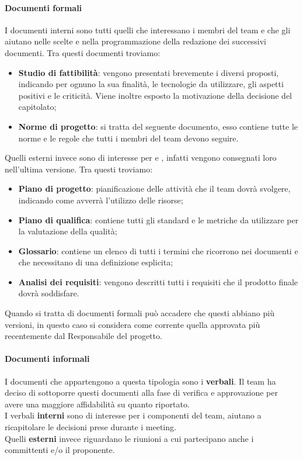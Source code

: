 \paragraph{Documenti formali}
I documenti interni sono tutti quelli che interessano i membri del team e che gli aiutano nelle scelte e nella programmazione della redazione dei successivi documenti.
Tra questi documenti troviamo:
\begin{itemize}
    \item\textbf{Studio di fattibilità}: vengono presentati brevemente i diversi  proposti, indicando per ognuno la sua finalità, le tecnologie da utilizzare, gli aspetti positivi e le criticità. Viene inoltre esposto la motivazione della decisione del capitolato;
    \item\textbf{Norme di progetto}: si tratta del seguente documento, esso contiene tutte le norme e le regole che tutti i membri del team devono seguire.
\end{itemize}
Quelli esterni invece sono di interesse per  e , infatti vengono consegnati loro nell'ultima versione.
Tra questi troviamo:
\begin{itemize}
    \item\textbf{Piano di progetto}: pianificazione delle attività che il team dovrà svolgere, indicando come avverrà l'utilizzo delle risorse;
    \item\textbf{Piano di qualifica}: contiene tutti gli standard e le metriche da utilizzare per la valutazione della qualità;
    \item\textbf{Glossario}: contiene un elenco di tutti i termini che ricorrono nei documenti e che necessitano di una definizione esplicita;
    \item\textbf{Analisi dei requisiti}: vengono descritti tutti i requisiti che il prodotto finale dovrà soddisfare.
\end{itemize}
Quando si tratta di documenti formali può accadere che questi abbiano più versioni, in questo caso si considera come corrente quella approvata più recentemente dal Responsabile del progetto.

\paragraph{Documenti informali}
I documenti che appartengono a questa tipologia sono i \textbf{verbali}.
Il team ha deciso di sottoporre questi documenti alla fase di verifica e approvazione per avere una maggiore affidabilità su quanto riportato.\\
I verbali \textbf{interni} sono di interesse per i componenti del team, aiutano a ricapitolare le decisioni prese durante i meeting.\\
Quelli \textbf{esterni} invece riguardano le riunioni a cui partecipano anche i committenti e/o il proponente.

